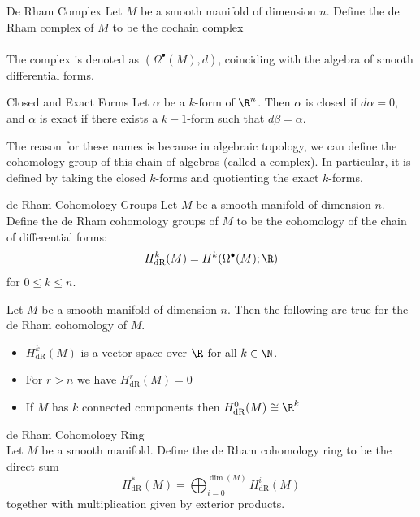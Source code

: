 \documentclass[a4paper]{article}
\begin{document}
\begin{defn}{De Rham Complex}{} Let $M$ be a smooth manifold of dimension $n$. Define the de Rham complex of $M$ to be the cochain complex \\
\\ 
The complex is denoted as $(\Omega^\bullet(M),d)$, coinciding with the algebra of smooth differential forms. 
\end{defn}

\begin{defn}{Closed and Exact Forms}{} Let $\alpha$ be a $k$-form of $\R^n$. Then $\alpha$ is closed if $d\alpha=0$, and $\alpha$ is exact if there exists a $k-1$-form such that $d\beta=\alpha$. 
\end{defn}

The reason for these names is because in algebraic topology, we can define the cohomology group of this chain of algebras (called a complex). In particular, it is defined by taking the closed $k$-forms and quotienting the exact $k$-forms. 

\begin{defn}{de Rham Cohomology Groups}{} Let $M$ be a smooth manifold of dimension $n$. Define the de Rham cohomology groups of $M$ to be the cohomology of the chain of differential forms: $$H_{\text{dR}}^k(M)=H^k(\Omega^\bullet(M);\R)$$ for $0\leq k\leq n$. 
\end{defn}

\begin{prp}{}{} Let $M$ be a smooth manifold of dimension $n$. Then the following are true for the de Rham cohomology of $M$. 
\begin{itemize}
\item $H_{\text{dR}}^k(M)$ is a vector space over $\R$ for all $k\in\N$. 
\item For $r>n$ we have $H_{\text{dR}}^r(M)=0$
\item If $M$ has $k$ connected components then $H_{\text{dR}}^0(M)\cong\R^k$
\end{itemize}
\end{prp}

\begin{defn}{de Rham Cohomology Ring}{}\\
Let $M$ be a smooth manifold. Define the de Rham cohomology ring to be the direct sum $$H_\text{dR}^\ast(M)=\bigoplus_{i=0}^{\dim(M)}H_\text{dR}^i(M)$$ together with multiplication given by exterior products. 
\end{defn}
\end{document}
